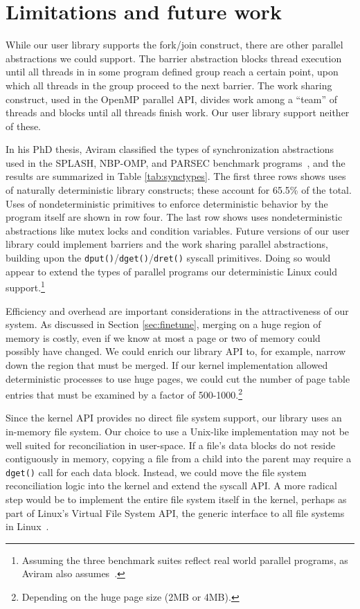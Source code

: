 
\section{Limitations and future work}



While our user library supports the fork/join construct, there are other
parallel abstractions we could support. The barrier abstraction
blocks thread execution until all threads in in some program defined group
reach a certain point, upon which all threads in the group proceed to the next
barrier. The work sharing construct, used in the OpenMP parallel API, divides
work among a ``team'' of threads and blocks until all threads finish work. Our
user library support neither of these.

In his PhD thesis, Aviram classified the types of synchronization abstractions
used in the SPLASH, NBP-OMP, and PARSEC benchmark
programs~\cite{aviram2011deterministic}, and the results are summarized in Table
\ref{tab:synctypes}. The first three rows shows uses of naturally deterministic
library constructs; these account for 65.5\% of the total. Uses of
nondeterministic primitives to enforce deterministic behavior by the program
itself are shown in row four. The last row shows
uses nondeterministic abstractions like mutex locks and condition variables.
Future versions of our user library could implement barriers and the work sharing
parallel abstractions,
building upon the {\tt dput()}/{\tt dget()}/{\tt dret()} syscall primitives.
Doing so would appear to extend the types of parallel
programs our deterministic Linux could support.\footnote{Assuming the three
benchmark suites reflect real world parallel programs, as Aviram also
assumes~\cite{aviram2011deterministic}.}

Efficiency and overhead are important considerations in the attractiveness of
our system. As discussed in Section \ref{sec:finetune}, merging on a huge
region of memory is costly, even if we know at most a page or two of memory
could possibly have changed. We could enrich our library API to, for example,
narrow down the region that must be merged. If our kernel implementation allowed
deterministic processes to use huge pages, we could cut the number of page
table entries that must be examined by a factor of 500-1000.\footnote{Depending
on the huge page size (2MB or 4MB).}

Since the kernel API provides no direct file system support, our library uses
an in-memory file system. Our choice to use a Unix-like implementation may not
be well suited for reconciliation in user-space. If a file's data blocks do not
reside contiguously in memory, copying a file from a child into the parent may
require a {\tt dget()} call for each data block. Instead, we could move the
file system reconciliation logic into the kernel and extend the syscall API. A
more radical step would be to implement the entire file system itself in the
kernel, perhaps as part of Linux's Virtual File System API, the generic
interface to all file systems in Linux~\cite{vfs}.

